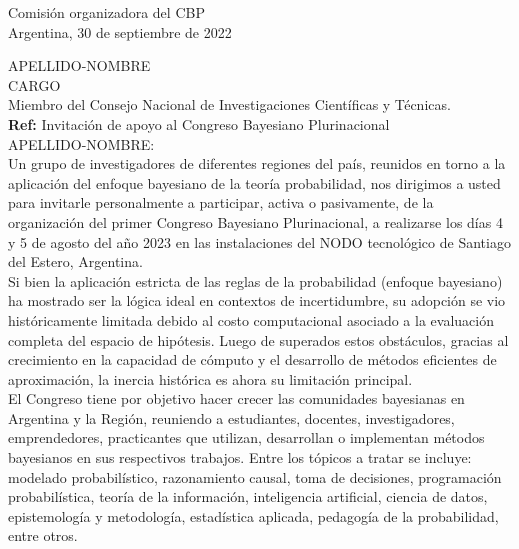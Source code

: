 \documentclass[a4paper,11pt]{article}
\begin{document}
\begin{flushright}
Comisión organizadora del CBP \\
Argentina, 30 de septiembre de 2022
\end{flushright} 

\vspace{0.1cm}
\noindent
APELLIDO-NOMBRE\\
CARGO \\
Miembro del Consejo Nacional de Investigaciones Científicas y Técnicas.\\

\hfill \textbf{Ref:} Invitación de apoyo al Congreso Bayesiano Plurinacional \\

\noindent APELLIDO-NOMBRE:\\

\indent Un grupo de investigadores de diferentes regiones del país, reunidos en torno a la aplicación del enfoque bayesiano de la teoría probabilidad, nos dirigimos a usted para invitarle personalmente a participar, activa o pasivamente, de la organización del primer Congreso Bayesiano Plurinacional, a realizarse los días 4 y 5 de agosto del año 2023 en las instalaciones del NODO tecnológico de Santiago del Estero, Argentina. \\

\indent Si bien la aplicación estricta de las reglas de la probabilidad (enfoque bayesiano) ha mostrado ser la lógica ideal en contextos de incertidumbre, su adopción se vio históricamente limitada debido al costo computacional asociado a la evaluación completa del espacio de hipótesis.
Luego de superados estos obstáculos, gracias al crecimiento en la capacidad de cómputo y el desarrollo de métodos eficientes de aproximación, la inercia histórica es ahora su limitación principal. \\

\indent El Congreso tiene por objetivo hacer crecer las comunidades bayesianas en Argentina y la Región, reuniendo a estudiantes, docentes, investigadores, emprendedores, practicantes que utilizan, desarrollan o implementan métodos bayesianos en sus respectivos trabajos. Entre los tópicos a tratar se incluye: modelado probabilístico, razonamiento causal, toma de decisiones, programación probabilística, teoría de la información, inteligencia artificial, ciencia de datos, epistemología y metodología, estadística aplicada, pedagogía de la probabilidad, entre otros. \\
\end{document}
